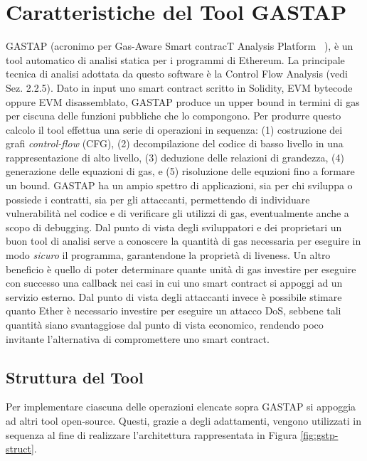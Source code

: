 \section{Caratteristiche del Tool GASTAP}

GASTAP (acronimo per Gas-Aware Smart contracT Analysis Platform ~\cite{DBLP:journals/corr/abs-1811-10403}), è un tool automatico di analisi statica per i programmi di Ethereum. La principale tecnica di analisi adottata da questo software è la Control Flow Analysis (vedi Sez. 2.2.5).\newline
\indent Dato in input uno smart contract scritto in Solidity, EVM bytecode oppure EVM disassemblato, GASTAP produce un upper bound in termini di gas per ciscuna delle funzioni pubbliche che lo compongono. Per produrre questo calcolo il tool effettua una serie di operazioni in sequenza: (1) costruzione dei grafi \textit{control-flow} (CFG), (2) decompilazione del codice di basso livello in una rappresentazione di alto livello, (3) deduzione delle relazioni di grandezza, (4) generazione delle equazioni di gas, e (5) risoluzione delle equzioni fino a formare un bound.\newline
\indent GASTAP ha un ampio spettro di applicazioni, sia per chi sviluppa o possiede i contratti, sia per gli attaccanti, permettendo di individuare vulnerabilità nel codice e di verificare gli utilizzi di gas, eventualmente anche a scopo di debugging.
Dal punto di vista degli sviluppatori e dei proprietari un buon tool di analisi serve a conoscere la quantità di gas necessaria per eseguire in modo \textit{sicuro} il programma, garantendone la proprietà di liveness. Un altro beneficio è quello di poter determinare quante unità di gas investire per eseguire con successo una callback nei casi in cui uno smart contract si appoggi ad un servizio esterno.
Dal punto di vista degli attaccanti invece è possibile stimare quanto Ether è necessario investire per eseguire un attacco DoS, sebbene tali quantità siano svantaggiose dal punto di vista economico, rendendo poco invitante l'alternativa di compromettere uno smart contract.\newline

    \subsection{Struttura del Tool}
    
    Per implementare ciascuna delle operazioni elencate sopra GASTAP si appoggia ad altri tool open-source. Questi, grazie a degli adattamenti, vengono utilizzati in sequenza al fine di realizzare l'architettura rappresentata in Figura \ref{fig:gstp-struct}.\newline 
    
